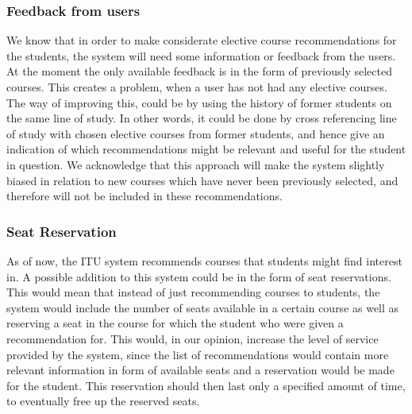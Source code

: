 \subsubsection*{Feedback from users}
We know that in order to make considerate elective course recommendations for the students, the system will need some information or feedback from the users. At the moment the only available feedback is in the form of previously selected courses. This creates a problem, when a user has not had any elective courses.\newline
The way of improving this, could be by using the history of former students on the same line of study. In other words, it could be done by cross referencing line of study with chosen elective courses from former students, and hence give an indication of which recommendations might be relevant and useful for the student in question.\newline
We acknowledge that this approach will make the system slightly biased in relation to new courses which have never been previously selected, and therefore will not be included in these recommendations.

\subsubsection*{Seat Reservation}
As of now, the ITU system recommends courses that students might find interest in. A possible addition to this system could be in the form of seat reservations.\newline 
This would mean that instead of just recommending courses to students, the system would include the number of seats available in a certain course as well as reserving a seat in the course for which the student who were given a recommendation for. This would, in our opinion, increase the level of service provided by the system, since the list of recommendations would contain more relevant information in form of available seats and a reservation would be made for the student. This reservation should then last only a specified amount of time, to eventually free up the reserved seats.\newline

